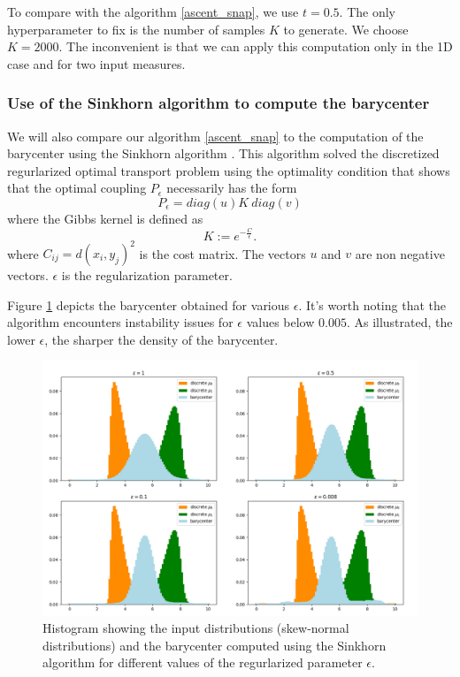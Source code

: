 To compare with the algorithm \ref{ascent_snap}, we use $t=0.5$. The only hyperparameter to fix is the number of samples $K$ to generate. We choose $K=2000$. The inconvenient is that we can apply this computation only in the 1D case and for two input measures.

\subsubsection{Use of the Sinkhorn algorithm to compute the barycenter} \label{sec:iterative_bregman}

We will also compare our algorithm \ref{ascent_snap} to the computation of the barycenter using the Sinkhorn algorithm \cite{peyre_computational_2020}. This algorithm solved the discretized regurlarized optimal transport problem using the optimality condition that shows that the optimal coupling $P_\epsilon$ necessarily has the form 
$$P_\epsilon = diag\left(u\right) K\ diag\left(v\right)$$
where the Gibbs kernel is defined as
$$K := e^{-\frac{C}{\epsilon}}.$$
where $C_{ij} = d(x_i, y_j)^2$ is the cost matrix. The vectors $u$ and $v$ are non negative vectors. $\epsilon$ is the regularization parameter.

Figure \ref{fig:sinkhorn_1D_2skew} depicts the barycenter obtained for various $\epsilon$. It's worth noting that the algorithm encounters instability issues for $\epsilon$ values below $0.005$. As illustrated, the lower $\epsilon$, the sharper the density of the barycenter.

\begin{figure}
    \centering
    \includegraphics[width=\textwidth]{figures/sinkhorn_1D_2skew.png}
    \caption{Histogram showing the input distributions (skew-normal distributions) and the barycenter computed using the Sinkhorn algorithm for different values of the regurlarized parameter $\epsilon$.}
    \label{fig:sinkhorn_1D_2skew}
\end{figure}

